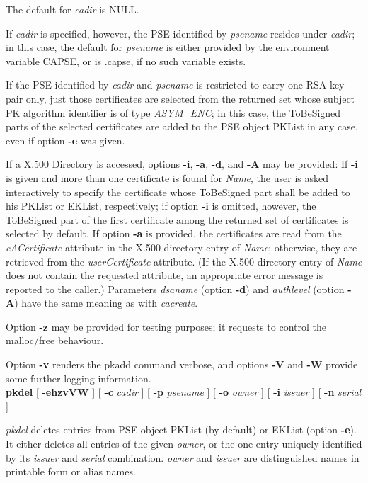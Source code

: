 The default for {\em cadir} is NULL. 

If {\em cadir} is specified,
however, the PSE identified by {\em psename} resides under {\em cadir}; in this case, the default
for {\em psename} is either provided by the environment variable CAPSE, or is .capse, if no such variable
exists.

If the PSE identified by {\em cadir} and {\em psename} is restricted to carry 
one RSA key pair only, just those certificates are selected from the returned set whose
subject PK algorithm identifier is of type {\em ASYM\_ENC}; in this case, the
ToBeSigned parts of the selected
certificates are added to the PSE object PKList in any case, even if option {\bf -e} was given. 
 
If a X.500 Directory is accessed, options {\bf -i}, {\bf -a}, {\bf -d}, and {\bf -A} may
be provided:
If {\bf -i} is given and more than one certificate is found for {\em Name}, the user is asked
interactively to specify the certificate whose ToBeSigned part shall be added to his
PKList or EKList, respectively; if option {\bf -i} is omitted, however, the ToBeSigned part
of the first certificate among the returned set of certificates is selected by default.
If option {\bf -a} is provided, the certificates are read from the {\em cACertificate} attribute in
the X.500 directory entry of {\em Name}; otherwise, they are retrieved from the {\em userCertificate} attribute. (If the X.500 directory entry of {\em Name} does not contain the requested attribute,
an appropriate error message is reported to the caller.)
Parameters {\em dsaname} (option {\bf -d}) and {\em authlevel} (option {\bf -A}) have the same meaning as with {\em cacreate}.
 
Option {\bf -z} may be provided for testing purposes; it requests to control the malloc/free behaviour.

Option {\bf -v} renders the pkadd command verbose, and options {\bf -V} and {\bf -W} 
provide some further logging
information.
\\ [1em] 
{\bf pkdel} [ {\bf -ehzvVW} ] [ {\bf -c} {\em cadir} ] [ {\bf -p} {\em psename} ] [ {\bf -o} {\em owner} ] [ {\bf -i} {\em issuer} ] [ 
{\bf -n} {\em serial} ] 

{\em pkdel} deletes entries from PSE object PKList (by default) or EKList (option {\bf -e}). It
either deletes all entries of the given {\em owner}, or the one entry uniquely identified
by its {\em issuer} and {\em serial} combination. {\em owner} and {\em issuer} are distinguished
names in printable form or alias names.
 
